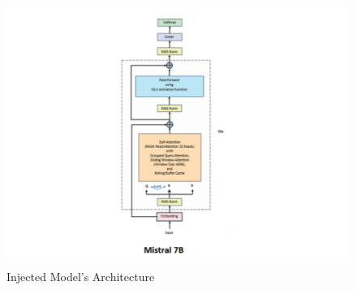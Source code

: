 \begin{figure}[!htbp]
    \centering
    \includegraphics[width=1\linewidth]{images/Mistral-7B-Arch.png}
    \caption{Injected Model's Architecture}
    \label{fig:enter-label}
\end{figure}